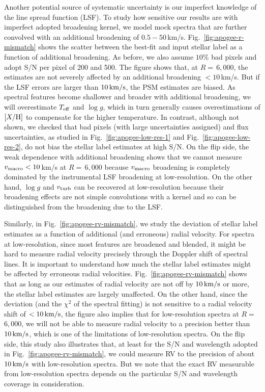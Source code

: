\documentclass[iop]{emulateapj}
\begin{document}
\begin{CJK*}{UTF8}{gbsn}
Another potential source of systematic uncertainty is our imperfect knowledge of the line spread function (LSF).  To study how sensitive our results are with imperfect adopted broadening kernel, we model mock spectra that are further convolved with an additional broadening of $0.5-50\,$km/s. Fig.~\ref{fig:apogee-r-mismatch} shows the scatter between the best-fit and input stellar label as a function of additional broadening. As before, we also assume $10\%$ bad pixels and adopt S/N per pixel of 200 and 500. The figure shows that, at $R=\,$6$,$000, the estimates are not severely affected by an additional broadening $< 10\,$km/s. But if the LSF errors are larger than $10 \, {\rm km/s}$, the PSM estimates are biased. As spectral features become shallower and broader with additional broadening, we will overestimate $T_{\rm eff}$ and $\log g$, which in turn generally causes overestimations of $[X/{\rm H}]$ to compensate for the higher temperature. In contrast, although not shown, we checked that bad pixels (with large uncertainties assigned) and flux uncertainties, as studied in Fig.~\ref{fig:apogee-low-res-1} and Fig.~\ref{fig:apogee-low-res-2}, do not bias the stellar label estimates at high S/N. On the flip side, the weak dependence with additional broadening shows that we cannot measure $v_{\rm macro} < 10\,$km/s at $R =\,$6$,$000 because $v_{\rm macro}$ broadening is completely dominated by the instrumental LSF broadening at low-resolution. On the other hand, $\log g$ and $v_{\rm turb}$ can be recovered at low-resolution because their broadening effects are not simple convolutions with a kernel and so can be distinguished from the broadening due to the LSF.

Similarly, in Fig.~\ref{fig:apogee-rv-mismatch}, we study the deviation of stellar label estimates as a function of additional (and erroneous) radial velocity. For spectra at low-resolution, since most features are broadened and blended, it might be hard to measure radial velocity precisely through the Doppler shift of spectral lines. It is important to understand how much the stellar label estimates might be affected by erroneous radial velocities. Fig.~\ref{fig:apogee-rv-mismatch} shows that as long as our estimates of radial velocity are not off by $10 \, {\rm km/s}$ or more, the stellar label estimates are largely unaffected. On the other hand, since the deviation (and the $\chi^2$ of the spectral fitting) is not sensitive to a radial velocity shift of $< 10 \, {\rm km/s}$, the figure also implies that for low-resolution spectra at $R =\,$6$,$000, we will not be able to measure radial velocity to a precision better than $10 \, {\rm km/s}$, which is one of the limitations of low-resolution spectra. On the flip side, this study also illustrates that, at least for the S/N and wavelength adopted in Fig.~\ref{fig:apogee-rv-mismatch}, we could measure RV to the precision of about $10 \, {\rm km/s}$ with low-resolution spectra. But we note that the exact RV measurable from low-resolution spectra depends on the particular S/N and wavelength coverage in consideration.


\end{CJK*}
\end{document}
